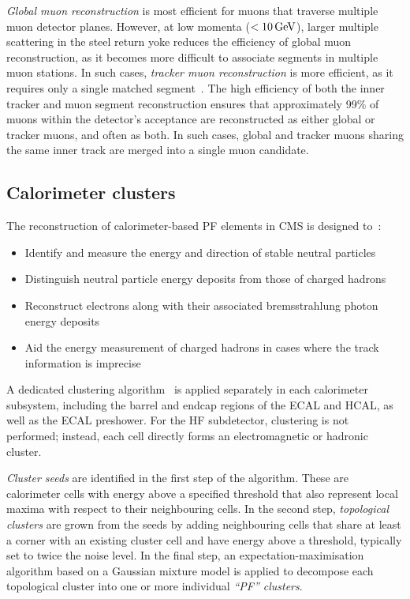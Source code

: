 \textit{Global muon reconstruction} is most efficient for muons that traverse multiple muon detector planes. However, at low momenta ($<10\,\text{Ge\hspace{-.08em}V}$), larger multiple scattering in the steel return yoke reduces the efficiency of global muon reconstruction, as it becomes more difficult to associate segments in multiple muon stations. In such cases, \textit{tracker muon reconstruction} is more efficient, as it requires only a single matched segment~\cite{CMS_Muon_System_Performance_2}. The high efficiency of both the inner tracker and muon segment reconstruction ensures that approximately 99\% of muons within the detector's acceptance are reconstructed as either global or tracker muons, and often as both.  In such cases, global and tracker muons sharing the same inner track are merged into a single muon candidate.

\subsection{Calorimeter clusters}

The reconstruction of calorimeter-based PF elements in CMS is designed to~\cite{ParticleFlow}:

\begin{itemize}
    \item Identify and measure the energy and direction of stable neutral particles
    \item Distinguish neutral particle energy deposits from those of charged hadrons
    \item Reconstruct electrons along with their associated bremsstrahlung photon energy deposits
    \item Aid the energy measurement of charged hadrons in cases where the track information is imprecise
\end{itemize}

A dedicated clustering algorithm~\cite{ParticleFlow} is applied separately in each calorimeter subsystem, including the barrel and endcap regions of the ECAL and HCAL, as well as the ECAL preshower. For the HF subdetector, clustering is not performed; instead, each cell directly forms an electromagnetic or hadronic cluster. 

\textit{Cluster seeds} are identified in the first step of the algorithm. These are calorimeter cells with energy above a specified threshold that also represent local maxima with respect to their neighbouring cells. In the second step, \textit{topological clusters} are grown from the seeds by adding neighbouring cells that share at least a corner with an existing cluster cell and have energy above a threshold, typically set to twice the noise level. In the final step, an expectation-maximisation algorithm based on a Gaussian mixture model is applied to decompose each topological cluster into one or more individual \textit{``PF'' clusters}.

